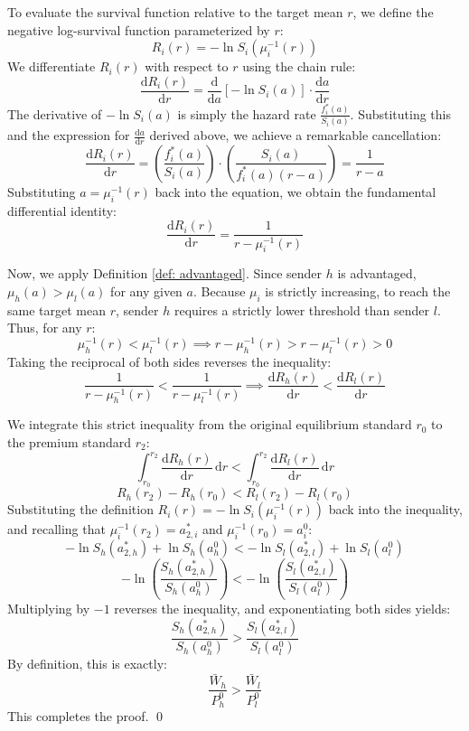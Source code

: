 \documentclass[12pt, a4paper]{article}
\begin{document}
To evaluate the survival function relative to the target mean $r$, we define the negative log-survival function parameterized by $r$:
\[
    R_i(r) = -\ln S_i(\mu_i^{-1}(r))
\]
We differentiate $R_i(r)$ with respect to $r$ using the chain rule:
\[
    \frac{\mathrm{d} R_i(r)}{\mathrm{d} r} = \frac{\mathrm{d}}{\mathrm{d} a} [-\ln S_i(a)] \cdot \frac{\mathrm{d} a}{\mathrm{d} r}
\]
The derivative of $-\ln S_i(a)$ is simply the hazard rate $\frac{f_i^*(a)}{S_i(a)}$. Substituting this and the expression for $\frac{\mathrm{d}a}{\mathrm{d}r}$ derived above, we achieve a remarkable cancellation:
\[
    \frac{\mathrm{d} R_i(r)}{\mathrm{d} r} = \left( \frac{f_i^*(a)}{S_i(a)} \right) \cdot \left( \frac{S_i(a)}{f_i^*(a) (r - a)} \right) = \frac{1}{r - a}
\]
Substituting $a = \mu_i^{-1}(r)$ back into the equation, we obtain the fundamental differential identity:
\[
    \frac{\mathrm{d} R_i(r)}{\mathrm{d} r} = \frac{1}{r - \mu_i^{-1}(r)}
\]

Now, we apply Definition \ref{def: advantaged}. Since sender $h$ is advantaged, $\mu_h(a) > \mu_l(a)$ for any given $a$. Because $\mu_i$ is strictly increasing, to reach the same target mean $r$, sender $h$ requires a strictly lower threshold than sender $l$. Thus, for any $r$:
\[
    \mu_h^{-1}(r) < \mu_l^{-1}(r) \implies r - \mu_h^{-1}(r) > r - \mu_l^{-1}(r) > 0
\]
Taking the reciprocal of both sides reverses the inequality:
\[
    \frac{1}{r - \mu_h^{-1}(r)} < \frac{1}{r - \mu_l^{-1}(r)} \implies \frac{\mathrm{d} R_h(r)}{\mathrm{d} r} < \frac{\mathrm{d} R_l(r)}{\mathrm{d} r}
\]

We integrate this strict inequality from the original equilibrium standard $r_0$ to the premium standard $r_2$:
\[
    \int_{r_0}^{r_2} \frac{\mathrm{d} R_h(r)}{\mathrm{d} r} \, \mathrm{d}r < \int_{r_0}^{r_2} \frac{\mathrm{d} R_l(r)}{\mathrm{d} r} \, \mathrm{d}r
\]
\[
    R_h(r_2) - R_h(r_0) < R_l(r_2) - R_l(r_0)
\]
Substituting the definition $R_i(r) = -\ln S_i(\mu_i^{-1}(r))$ back into the inequality, and recalling that $\mu_i^{-1}(r_2) = a_{2,i}^*$ and $\mu_i^{-1}(r_0) = a_i^0$:
\[
    -\ln S_h(a_{2,h}^*) + \ln S_h(a_h^0) < -\ln S_l(a_{2,l}^*) + \ln S_l(a_l^0)
\]
\[
    -\ln \left( \frac{S_h(a_{2,h}^*)}{S_h(a_h^0)} \right) < -\ln \left( \frac{S_l(a_{2,l}^*)}{S_l(a_l^0)} \right)
\]
Multiplying by $-1$ reverses the inequality, and exponentiating both sides yields:
\[
    \frac{S_h(a_{2,h}^*)}{S_h(a_h^0)} > \frac{S_l(a_{2,l}^*)}{S_l(a_l^0)}
\]
By definition, this is exactly:
\[
    \frac{\bar{W}_h}{P^0_h} > \frac{\bar{W}_l}{P^0_l}
\]
This completes the proof. \qed
\end{document}
